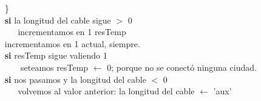 $~~~~~~~~$\}\\

$~~~~~~~~$\textbf{si} la longitud del cable sigue $>$ 0 \\
$~~~~~~~~~~~~~~~$incrementamos en 1 resTemp\\
		
$~~~~~~~~$incrementamos en 1 actual, siempre.\\

$~~~~~~~~$\textbf{si} resTemp sigue valiendo 1 \\
$~~~~~~~~~~~~~~~$ seteamos resTemp $\leftarrow$ 0; porque no se conectó ninguna ciudad. \\

$~~~~~~~~$\textbf{si} nos pasamos y la longitud del cable $<$ 0   \\
$~~~~~~~~~~~~~~~$volvemos al valor anterior: la longitud del cable $\leftarrow$ 'aux' \\

